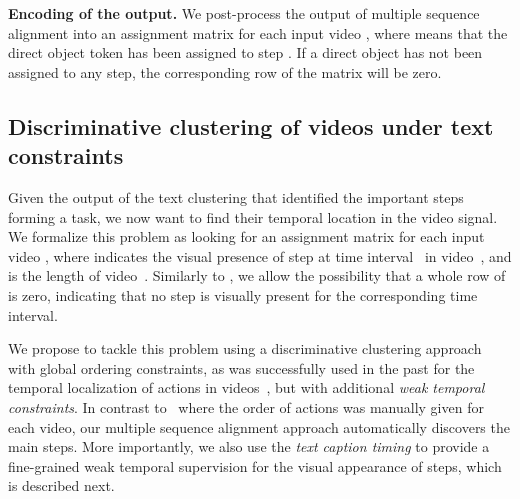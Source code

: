 \documentclass[10pt,twocolumn,letterpaper]{article}
\begin{document}
\textbf{Encoding of the output.}
We post-process the output of multiple sequence alignment into an assignment matrix  for each input video , 
where  means that the direct object token  has been assigned to step . 
If a direct object has not been assigned to any step, the corresponding row of the matrix  will be zero.

\subsection{Discriminative clustering of videos under text constraints}
\label{sec:model-video}

Given the output of the text clustering that identified the important  steps forming a task,
we now want to find their temporal location in the video signal. We formalize this problem
as looking for an assignment matrix  for each input video ,
where  indicates the visual presence of step  at time interval~ in video~, and  is the length of video~.
Similarly to , we allow the possibility that a whole row of  is zero, indicating that no step 
is visually present for the corresponding time interval.

We propose to tackle this problem using a discriminative clustering approach with global
ordering constraints, as was successfully used in the past
for the temporal localization of actions in videos~\cite{Bojanowski14weakly}, 
but with additional \emph{weak temporal constraints}.
In contrast to~\cite{Bojanowski14weakly} where the order of actions was manually
given for each video, our multiple sequence alignment approach automatically
discovers the main steps. More importantly, we also use the \emph{text caption timing}
to provide a fine-grained weak temporal supervision for the visual 
appearance of steps, which is described next.
\end{document}
